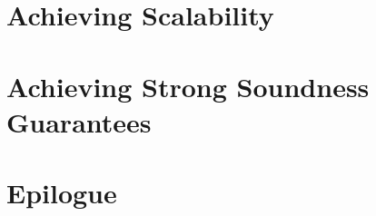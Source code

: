 \documentclass[ack,preface]{diphdthesis}
\begin{document}
\frontmatter

\mainmatter




\part{Achieving Scalability}



\part{Achieving Strong Soundness Guarantees}




\part{Epilogue}



\backmatter

\cleardoublepage
{}
{}
\printbibliography[title={References}]
\end{document}
